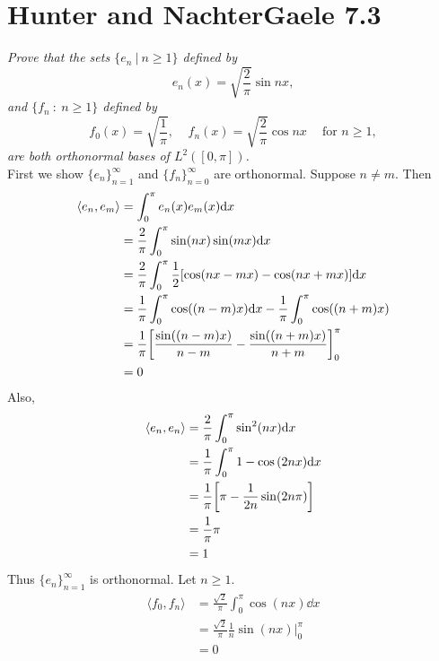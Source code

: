 \documentclass[12pt]{article}
\theoremstyle{plain}
\begin{document}
\section*{Hunter and NachterGaele 7.3}
\emph{Prove that the sets $\{e_n\ |\ n \geq 1\}$ defined by $$e_n(x) = \sqrt{\frac{2}{\pi}}\sin nx,$$ and $\{f_n\ :\ n \geq 1\}$ defined by $$f_0(x) = \sqrt{\frac{1}{\pi}},\ \ \ \ \ f_n(x) = \sqrt{\frac{2}{\pi}}\cos nx\ \ \ \ \text{ for } n \geq 1,$$ are both orthonormal bases of $L^2([0,\pi])$.} \\

First we show $\{e_n\}_{n=1}^\infty$ and $\{f_n\}_{n=0}^\infty$ are orthonormal.  Suppose $n \neq m$.  Then
\begin{align*}
    \langle e_n, e_m \rangle &= \int_0^\pi e_n(x)e_m(x) \dd x \\
    &= \frac{2}{\pi}\int_0^\pi \sin(nx) \sin (mx) \dd x\\
    &= \frac{2}{\pi}\int_0^\pi \frac{1}{2}\qty[\cos(nx - mx) - \cos(nx + mx)]\dd x \\
    &= \frac{1}{\pi}\int_0^\pi\cos((n-m)x)\dd x - \frac{1}{\pi}\int_0^\pi\cos((n+m)x) \\
    &= \frac{1}{\pi}\qty[\frac{\sin((n-m)x)}{n-m} - \frac{\sin((n+m)x)}{n+m}]_0^\pi \\
    &= 0
\end{align*}
Also,
\begin{align*}
    \langle e_n, e_n \rangle &= \frac{2}{\pi}\int_0^\pi \sin^2(nx)\dd x \\
    &= \frac{1}{\pi} \int_0^\pi 1 - \cos\qty(2nx) \dd x \\
    &= \frac{1}{\pi} \qty[\pi - \frac{1}{2n}\sin(2n\pi)] \\
    &= \frac{1}{\pi}\pi\\ 
    &= 1
\end{align*}
Thus $\{e_n\}_{n=1}^\infty$ is orthonormal.  Let $n \geq 1$.
\begin{align*}
    \langle f_0, f_n\rangle &= \frac{\sqrt{2}}{\pi}\int_0^\pi\cos(nx)\dd x \\
    &= \frac{\sqrt{2}}{\pi}\frac{1}{n}\sin(nx)\Big|_0^\pi \\
    &= 0
\end{align*}
\end{document}
